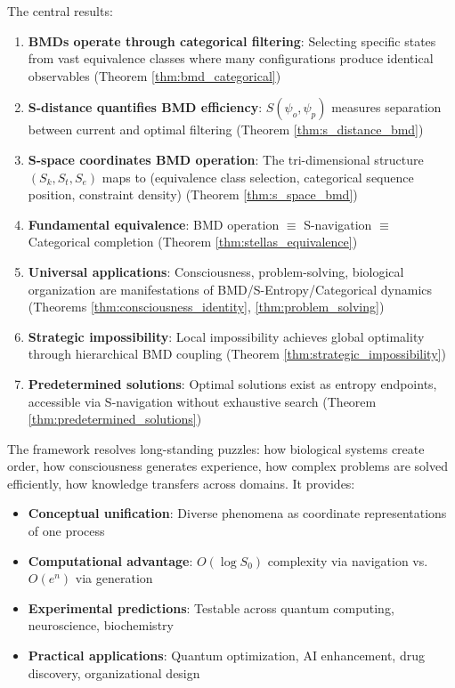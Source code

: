 \documentclass[12pt,a4paper]{article}
\begin{document}
The central results:

\begin{enumerate}
\item \textbf{BMDs operate through categorical filtering}: Selecting specific states from vast equivalence classes where many configurations produce identical observables (Theorem \ref{thm:bmd_categorical})

\item \textbf{S-distance quantifies BMD efficiency}: $S(\psi_o, \psi_p)$ measures separation between current and optimal filtering (Theorem \ref{thm:s_distance_bmd})

\item \textbf{S-space coordinates BMD operation}: The tri-dimensional structure $(S_k, S_t, S_e)$ maps to (equivalence class selection, categorical sequence position, constraint density) (Theorem \ref{thm:s_space_bmd})

\item \textbf{Fundamental equivalence}: BMD operation $\equiv$ S-navigation $\equiv$ Categorical completion (Theorem \ref{thm:stellas_equivalence})

\item \textbf{Universal applications}: Consciousness, problem-solving, biological organization are manifestations of BMD/S-Entropy/Categorical dynamics (Theorems \ref{thm:consciousness_identity}, \ref{thm:problem_solving})

\item \textbf{Strategic impossibility}: Local impossibility achieves global optimality through hierarchical BMD coupling (Theorem \ref{thm:strategic_impossibility})

\item \textbf{Predetermined solutions}: Optimal solutions exist as entropy endpoints, accessible via S-navigation without exhaustive search (Theorem \ref{thm:predetermined_solutions})
\end{enumerate}

The framework resolves long-standing puzzles: how biological systems create order, how consciousness generates experience, how complex problems are solved efficiently, how knowledge transfers across domains. It provides:

\begin{itemize}
\item \textbf{Conceptual unification}: Diverse phenomena as coordinate representations of one process
\item \textbf{Computational advantage}: $O(\log S_0)$ complexity via navigation vs. $O(e^n)$ via generation
\item \textbf{Experimental predictions}: Testable across quantum computing, neuroscience, biochemistry
\item \textbf{Practical applications}: Quantum optimization, AI enhancement, drug discovery, organizational design
\end{itemize}
\end{document}
